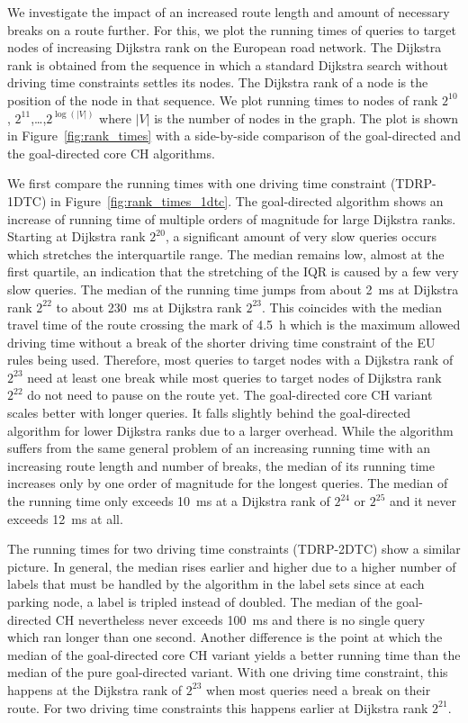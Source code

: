 We investigate the impact of an increased route length and amount of necessary breaks on a route further. For this, we plot the running times of queries to target nodes of increasing Dijkstra rank on the European road network. The Dijkstra rank is obtained from the sequence in which a standard Dijkstra search without driving time constraints settles its nodes. The Dijkstra rank of a node is the position of the node in that sequence. We plot running times to nodes of rank $2^{10}$, $2^{11}$,\dots,$2^{\log(|V|)}$ where $|V|$ is the number of nodes in the graph. The plot is shown in Figure~\ref{fig:rank_times} with a side-by-side comparison of the goal-directed and the goal-directed core CH algorithms.

We first compare the running times with one driving time constraint (TDRP-1DTC) in Figure~\ref{fig:rank_times_1dtc}. The goal-directed algorithm shows an increase of running time of multiple orders of magnitude for large Dijkstra ranks. Starting at Dijkstra rank $2^{20}$, a significant amount of very slow queries occurs which stretches the interquartile range. The median remains low, almost at the first quartile, an indication that the stretching of the IQR is caused by a few very slow queries. The median of the running time jumps from about \SI{2}{\milli\second} at Dijkstra rank $2^{22}$ to about \SI{230}{\milli\second} at Dijkstra rank $2^{23}$. This coincides with the median travel time of the route crossing the mark of \SI{4.5}{\hour} which is the maximum allowed driving time without a break of the shorter driving time constraint of the EU rules being used. Therefore, most queries to target nodes with a Dijkstra rank of $2^{23}$ need at least one break while most queries to target nodes of Dijkstra rank  $2^{22}$ do not need to pause on the route yet. The goal-directed core CH variant scales better with longer queries. It falls slightly behind the goal-directed algorithm for lower Dijkstra ranks due to a larger overhead. While the algorithm suffers from the same general problem of an increasing running time with an increasing route length and number of breaks, the median of its running time increases only by one order of magnitude for the longest queries. The median of the running time only exceeds \SI{10}{\milli\second} at a Dijkstra rank of $2^24$ or $2^25$ and it never exceeds \SI{12}{\milli\second} at all.

The running times for two driving time constraints (TDRP-2DTC) show a similar picture. In general, the median rises earlier and higher due to a higher number of labels that must be handled by the algorithm in the label sets since at each parking node, a label is tripled instead of doubled. The median of the goal-directed CH nevertheless never exceeds \SI{100}{\milli\second} and there is no single query which ran longer than one second. Another difference is the point at which the median of the goal-directed core CH variant yields a better running time than the median of the pure goal-directed variant. With one driving time constraint, this happens at the Dijkstra rank of $2^23$ when most queries need a break on their route. For two driving time constraints this happens earlier at Dijkstra rank $2^21$.

